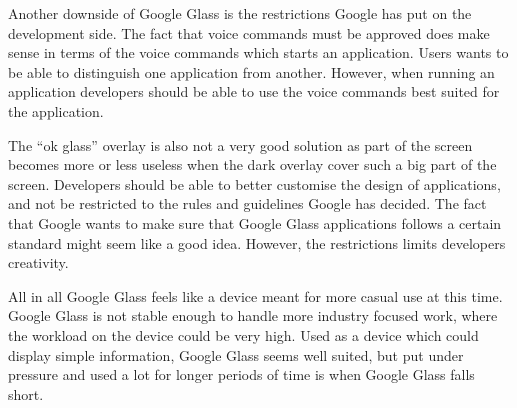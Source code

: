 Another downside of Google Glass is the restrictions Google has put on the development side. The fact that voice commands must be approved does make sense in terms of the voice commands which starts an application. Users wants to be able to distinguish one application from another. However, when running an application developers should be able to use the voice commands best suited for the application.

The ``ok glass'' overlay is also not a very good solution as part of the screen becomes more or less useless when the dark overlay cover such a big part of the screen. Developers should be able to better customise the design of applications, and not be restricted to the rules and guidelines Google has decided. The fact that Google wants to make sure that Google Glass applications follows a certain standard might seem like a good idea. However, the restrictions limits developers creativity.

All in all Google Glass feels like a device meant for more casual use at this time. Google Glass is not stable enough to handle more industry focused work, where the workload on the device could be very high. Used as a device which could display simple information, Google Glass seems well suited, but put under pressure and used a lot for longer periods of time is when Google Glass falls short.





